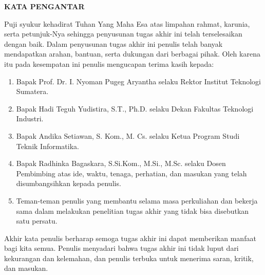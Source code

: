 \clearpage
{}%

\begin{justifying}
	\large \bfseries \centering \MakeUppercase{Kata Pengantar}\linebreak
	
	\normalsize \normalfont \justifying
	Puji syukur kehadirat Tuhan Yang Maha Esa atas limpahan rahmat, karunia, serta petunjuk-Nya sehingga penyusunan tugas akhir ini telah terselesaikan dengan baik. Dalam penyusunan tugas akhir ini penulis telah banyak mendapatkan arahan, bantuan, serta dukungan dari berbagai pihak. Oleh karena itu pada kesempatan ini penulis mengucapan terima kasih kepada: \par
	\begin{enumerate}
		\item Bapak Prof. Dr. I. Nyoman Pugeg Aryantha selaku Rektor Institut Teknologi Sumatera.  
		\item Bapak Hadi Teguh Yudistira, S.T., Ph.D. selaku Dekan Fakultas Teknologi Industri.
		\item Bapak Andika Setiawan, S. Kom., M. Cs. selaku Ketua Program Studi Teknik Informatika.
		\item Bapak Radhinka Bagaskara, S.Si.Kom., M.Si., M.Sc. selaku Dosen Pembimbing atas ide, waktu, tenaga, perhatian, dan masukan yang telah disumbangsihkan kepada penulis.
		\item Teman-teman penulis yang membantu selama masa perkuliahan dan bekerja sama dalam melakukan penelitian tugas akhir yang tidak bisa disebutkan satu persatu.
	\end{enumerate} \par
	Akhir kata penulis berharap semoga tugas akhir ini dapat memberikan manfaat bagi kita semua. Penulis menyadari bahwa tugas akhir ini tidak luput dari kekurangan dan kelemahan, dan penulis  terbuka untuk menerima saran, kritik, dan masukan.
	\vfill
	
\end{justifying}
\clearpage





